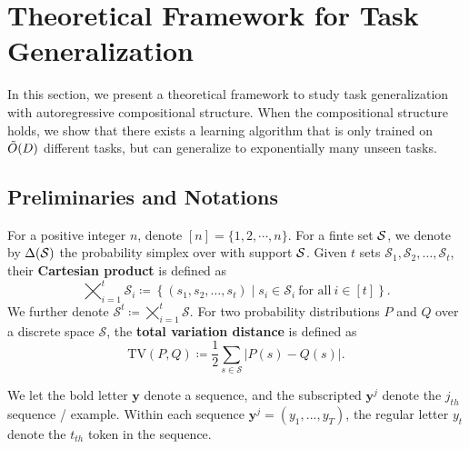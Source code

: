 \newcommand{\train}{\mathrm{train}}
\newcommand{\demo}{\mathrm{infer}}
\newcommand{\parity}{\mathrm{parity}}
\newcommand{\tv}{{\mathrm{TV}}}
\newcommand{\iid}{\overset{\text{i.i.d.}}{\sim} }
\newcommand{\xor}{\mathrm{xor}}
\section{Theoretical Framework for Task Generalization}\label{sec:theory}




In this section, we present a theoretical framework to study task generalization with autoregressive compositional structure. When the compositional structure holds, we show that there exists a learning algorithm that is only trained on $\tilde O(D)$ different tasks, but can generalize to exponentially many unseen tasks. 


\subsection{Preliminaries and Notations}\label{sec: theory formulation}

For a positive integer $n$, denote $[n]=\{1,2,\cdots,n\}$. For a finte set ${\mathcal{S}}$, we denote by $\Delta({\mathcal{S}})$ the probability simplex over with support ${\mathcal{S}}$. Given \( t \) sets \(\mathcal{S}_1, \mathcal{S}_2, \dots, \mathcal{S}_t\), their \textbf{Cartesian product} is defined as
\[
\bigtimes_{i=1}^t \mathcal{S}_i \coloneqq \left\{ (s_1, s_2, \dots, s_t) \mid s_i \in \mathcal{S}_i \ \text{for all} \ i \in [t]\right\}.
\]
We further denote $\mathcal{S}^{t} \coloneqq \bigtimes_{i=1}^t \mathcal{S}$. For two probability distributions \( P \) and \( Q \) over a discrete space \(\mathcal{S}\), the \textbf{total variation distance} is defined as
\[
\tv(P, Q) \coloneqq \frac{1}{2} \sum_{s \in \mathcal{S}} \left| P(s) - Q(s) \right|.
\]

We let the bold letter $ \bm{y}$ denote a sequence, and the subscripted $\bm{y}^j$ denote the $j_{th}$ sequence / example. Within each sequence $\bm{y}^j = (y_1, ..., y_T)$, the regular letter $y_t$ denote the $t_{th}$ token in the sequence. 




